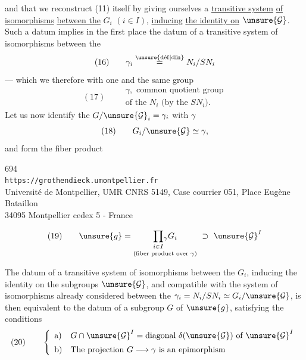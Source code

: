 \noindent {}\quad
{}

and that we reconstruct (11) itself by giving ourselves a \uline{transitive system} \uline{of isomorphisms} \uline{between the} $G_i$ $(i\in I)$, \uline{inducing} \uline{the identity on} $\unsure{\mathcal G}$. Such a datum implies in the first place the datum of a transitive system of isomorphisms between the
\[
(16)\qquad 
\gamma_i\overset{\unsure{\mathrm{d\acute ef}|\mathrm{dfn}}}{=}N_i/SN_i
\]
--- which we  therefore with one and the same group
\[
(17)\qquad 
\begin{gathered}
\gamma,\text{ common quotient group}\\
\text{of the }N_i\text{ (by the }SN_i\text{).}
\end{gathered}
\]
Let us now identify the $G/\unsure{\mathcal G}_i=\gamma_i$ with $\gamma$
\[
(18)\qquad G_i/\unsure{\mathcal G}\simeq\gamma,
\]
and form the fiber product


\begin{center}
694\\
\texttt{https://grothendieck.umontpellier.fr}\\
Université de Montpellier, UMR CNRS 5149, Case courrier 051, Place Eugène Bataillon\\
34095 Montpellier cedex 5 - France
\end{center}



\[
(19)\qquad 
\unsure{g}=\underset{\text{(fiber product over }\gamma\text{)}}{\prod_{i\in I}\!{}_{\gamma}G_i}\ \supset\ \unsure{\mathcal G}^I
\]

The datum of a transitive system of isomorphisms between the $G_i$, inducing the identity on the subgroups $\unsure{\mathcal G}$, and compatible with the system   of isomorphisms already considered between the $\gamma_i=N_i/SN_i\simeq G_i/\unsure{\mathcal G}$, is then equivalent to the datum of a subgroup $G$ of $\unsure{g}$, satisfying the conditions
\[
(20)\qquad 
\left\{\begin{array}{ll}
\text{a)}&G\cap\unsure{\mathcal G}^I=\text{diagonal }\delta(\unsure{\mathcal G})\text{ of }\unsure{\mathcal G}^I\\[5pt]
\text{b)}&\text{The projection }G\longrightarrow\gamma\text{ is an epimorphism}
\end{array}\right.
\]

